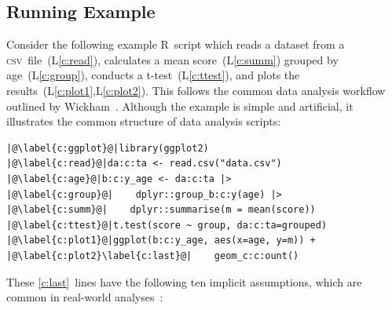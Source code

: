 \subsection{Running Example}\label{sec:running-example}
\def\lref#1{L\ref{#1}}%
Consider the following example R~script which reads a dataset from a \textsc{csv}~file~(\lref{c:read}),
calculates a mean score~(\lref{c:summ}) grouped by age~(\lref{c:group}), conducts a t-test~(\lref{c:ttest}), and plots the results~(\lref{c:plot1},\;\lref{c:plot2}). This follows the common data analysis workflow outlined by Wickham~\cite{hadley2016r}. Although the example is simple and artificial, it illustrates the common structure of data analysis scripts:
\begin{verbatim}
|@\label{c:ggplot}@|library(ggplot2)
|@\label{c:read}@|da:c:ta <- read.csv("data.csv")
|@\label{c:age}@|b:c:y_age <- da:c:ta |>
|@\label{c:group}@|    dplyr::group_b:c:y(age) |>
|@\label{c:summ}@|    dplyr::summarise(m = mean(score))
|@\label{c:ttest}@|t.test(score ~ group, da:c:ta=grouped)
|@\label{c:plot1}@|ggplot(b:c:y_age, aes(x=age, y=m)) + 
|@\label{c:plot2}\label{c:last}@|    geom_c:c:ount()
\end{verbatim}
\def\expl#1#2{\textit{\color{gray}#1~\hfill#2}}
These \ref{c:last}~lines have the following ten implicit assumptions, which are common in real-world analyses~\cite{trisovic_largescale_2022,DBLP:conf/msr/IslamAW24,10.1093/gigascience/giad113}: %
